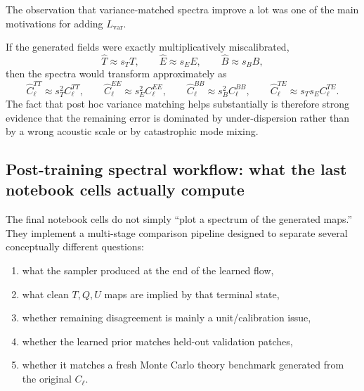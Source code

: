 \documentclass[11pt]{article}
\begin{document}
The observation that variance-matched spectra improve a lot was one of the main motivations for adding \(L_{\mathrm{var}}\).

If the generated fields were exactly multiplicatively miscalibrated,
\begin{equation}
  \hat T \approx s_T T,\qquad
  \hat E \approx s_E E,\qquad
  \hat B \approx s_B B,
\end{equation}
then the spectra would transform approximately as
\begin{equation}
  \widehat C_\ell^{TT}\approx s_T^2 C_\ell^{TT},\qquad
  \widehat C_\ell^{EE}\approx s_E^2 C_\ell^{EE},\qquad
  \widehat C_\ell^{BB}\approx s_B^2 C_\ell^{BB},\qquad
  \widehat C_\ell^{TE}\approx s_T s_E C_\ell^{TE}.
\end{equation}
The fact that post hoc variance matching helps substantially is therefore strong evidence that the remaining error is dominated by under-dispersion rather than by a wrong acoustic scale or by catastrophic mode mixing.

\subsection{Post-training spectral workflow: what the last notebook cells actually compute}

The final notebook cells do not simply ``plot a spectrum of the generated maps.'' They implement a multi-stage comparison pipeline designed to separate several conceptually different questions:
\begin{enumerate}[leftmargin=1.5em]
  \item what the sampler produced at the end of the learned flow,
  \item what clean \(T,Q,U\) maps are implied by that terminal state,
  \item whether remaining disagreement is mainly a unit/calibration issue,
  \item whether the learned prior matches held-out validation patches,
  \item whether it matches a fresh Monte Carlo theory benchmark generated from the original \(C_\ell\).
\end{enumerate}
\end{document}
